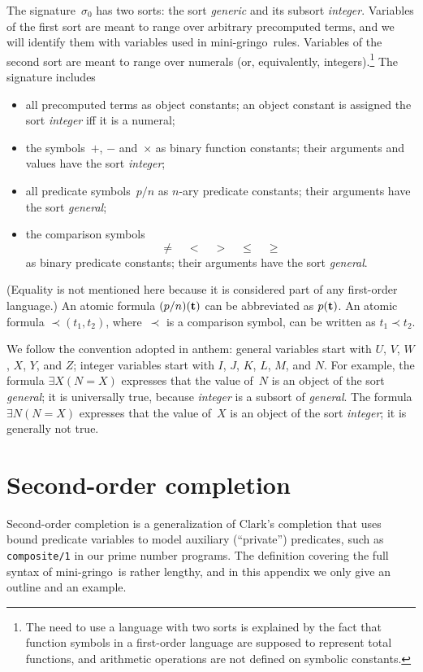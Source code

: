 \documentclass{article}
\def\gringo{{\sc gringo}}
\begin{document}
The signature~$\sigma_0$ \cite[Section~2.2]{fan22}
has two sorts: the sort \emph{generic} and its subsort
\emph{integer}.
Variables of the first sort are meant to
range over arbitrary precomputed terms, and we will identify them with
variables used in mini-\gringo\ rules.  Variables of the second sort are meant
to range over numerals (or, equivalently, integers).\footnote{The need to
  use a language with two sorts is explained by the fact that function symbols
in a first-order language are supposed to represent total functions, and
arithmetic operations are not defined on symbolic constants.}
The signature includes
\begin{itemize}
\item all precomputed terms as object constants; an object constant
  is assigned the sort \emph{integer} iff it is a numeral;
\item the symbols~$+$, $-$ and~$\times$ as binary function constants;
  their arguments and values have the sort \emph{integer};
\item all predicate symbols~$p/n$ as $n$-ary predicate
  constants; their arguments have the sort \emph{general};
\item the comparison symbols
$$\neq\quad<\quad>\quad\leq\quad\geq$$
as binary predicate constants; their arguments have the sort \emph{general}.
\end{itemize}
(Equality is not mentioned here because it is considered part of any
first-order language.)  An atomic formula $(p/n)({\bf t})$ can be abbreviated
as $p({\bf t})$. An atomic formula $\prec\!\!(t_1,t_2)$, where~$\prec$ is a
comparison symbol, can be written as $t_1\prec t_2$.

We follow the convention adopted in {\sc anthem\/}:
general variables start with $U$, $V$, $W$, $X$, $Y$, and $Z$;
integer variables start with $I$, $J$, $K$, $L$, $M$, and $N$.
For example, the formula
$\exists X (N=X)$ expresses that the value of~$N$ is an object of the sort
\emph{general\/};  it is universally true, because \emph{integer} is a
subsort of \emph{general}.  The formula
$\exists N (N=X)$ expresses that the value of~$X$ is an object of the sort
\emph{integer\/}; it is generally not true.

\section{Second-order completion} \label{appb}

Second-order completion \cite[Sections~6.1,~6.2]{fan20}
is a generalization of Clark's completion
\cite{cla78} that uses bound predicate variables to model auxiliary
(``private'') predicates, such as \verb|composite/1| in our prime number
programs.  The definition covering the full
syntax of mini-\gringo\ is rather lengthy, and in this appendix we only give
an outline and an example.
\end{document}
